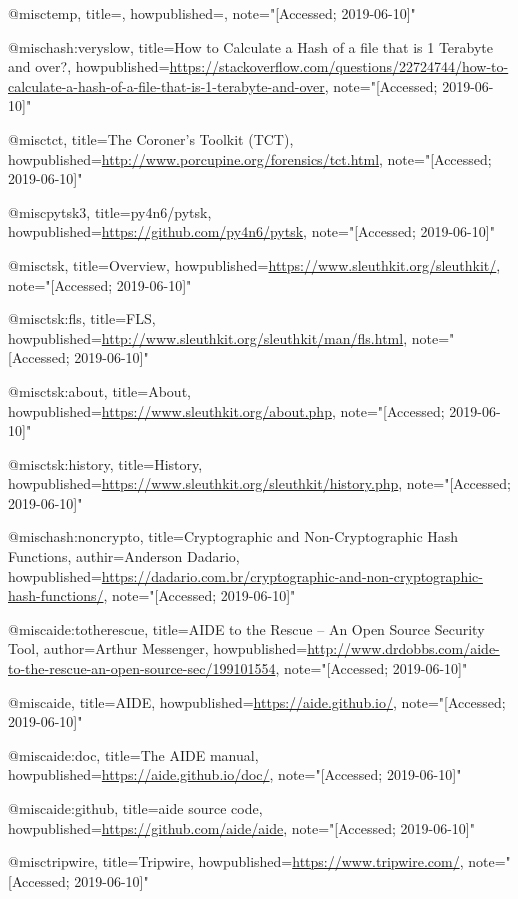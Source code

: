 
@misc{temp,
  title={{}},
  howpublished={\url{}},
  note="[Accessed; 2019-06-10]"
}

@misc{hash:veryslow,
  title={{How to Calculate a Hash of a file that is 1 Terabyte and over?}},
  howpublished={\url{https://stackoverflow.com/questions/22724744/how-to-calculate-a-hash-of-a-file-that-is-1-terabyte-and-over}},
  note="[Accessed; 2019-06-10]"
}

@misc{tct,
  title={{The Coroner's Toolkit (TCT)}},
  howpublished={\url{http://www.porcupine.org/forensics/tct.html}},
  note="[Accessed; 2019-06-10]"
}

@misc{pytsk3,
  title={{py4n6/pytsk}},
  howpublished={\url{https://github.com/py4n6/pytsk}},
  note="[Accessed; 2019-06-10]"
}

@misc{tsk,
  title={{Overview}},
  howpublished={\url{https://www.sleuthkit.org/sleuthkit/}},
  note="[Accessed; 2019-06-10]"
}

@misc{tsk:fls,
  title={{FLS}},
  howpublished={\url{http://www.sleuthkit.org/sleuthkit/man/fls.html}},
  note="[Accessed; 2019-06-10]"
}

@misc{tsk:about,
  title={{About}},
  howpublished={\url{https://www.sleuthkit.org/about.php}},
  note="[Accessed; 2019-06-10]"
}

@misc{tsk:history,
  title={{History}},
  howpublished={\url{https://www.sleuthkit.org/sleuthkit/history.php}},
  note="[Accessed; 2019-06-10]"
}

@misc{hash:noncrypto,
  title={{Cryptographic and Non-Cryptographic Hash Functions}},
  authir={Anderson Dadario},
  howpublished={\url{https://dadario.com.br/cryptographic-and-non-cryptographic-hash-functions/}},
  note="[Accessed; 2019-06-10]"
}

@misc{aide:totherescue,
  title={{AIDE to the Rescue -- An Open Source Security Tool}},
  author={Arthur Messenger},
  howpublished={\url{http://www.drdobbs.com/aide-to-the-rescue-an-open-source-sec/199101554}},
  note="[Accessed; 2019-06-10]"
}

@misc{aide,
  title={{AIDE}},
  howpublished={\url{https://aide.github.io/}},
  note="[Accessed; 2019-06-10]"
}

@misc{aide:doc,
  title={{The AIDE manual}},
  howpublished={\url{https://aide.github.io/doc/}},
  note="[Accessed; 2019-06-10]"
}

@misc{aide:github,
  title={{aide source code}},
  howpublished={\url{https://github.com/aide/aide}},
  note="[Accessed; 2019-06-10]"
}


@misc{tripwire,
  title={{Tripwire}},
  howpublished={\url{https://www.tripwire.com/}},
  note="[Accessed; 2019-06-10]"
}

